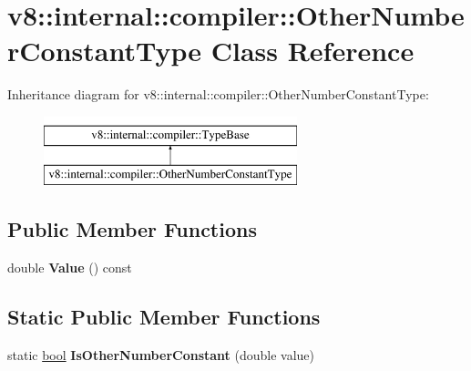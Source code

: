 \hypertarget{classv8_1_1internal_1_1compiler_1_1OtherNumberConstantType}{}\section{v8\+:\+:internal\+:\+:compiler\+:\+:Other\+Number\+Constant\+Type Class Reference}
\label{classv8_1_1internal_1_1compiler_1_1OtherNumberConstantType}
Inheritance diagram for v8\+:\+:internal\+:\+:compiler\+:\+:Other\+Number\+Constant\+Type\+:\begin{figure}[H]
\begin{center}
\leavevmode
\includegraphics[height=2.000000cm]{classv8_1_1internal_1_1compiler_1_1OtherNumberConstantType}
\end{center}
\end{figure}
\subsection*{Public Member Functions}
\begin{DoxyCompactItemize}
\item 
\mbox{\label{classv8_1_1internal_1_1compiler_1_1OtherNumberConstantType_a33d79449d3ac282a98e2017aaaff9ad7}} 
double {\bfseries Value} () const
\end{DoxyCompactItemize}
\subsection*{Static Public Member Functions}
\begin{DoxyCompactItemize}
\item 
\mbox{\label{classv8_1_1internal_1_1compiler_1_1OtherNumberConstantType_a9f7b1612cfb7d050bd6cf1dedc8bc890}} 
static \mbox{\hyperlink{classbool}{bool}} {\bfseries Is\+Other\+Number\+Constant} (double value)
\end{DoxyCompactItemize}
